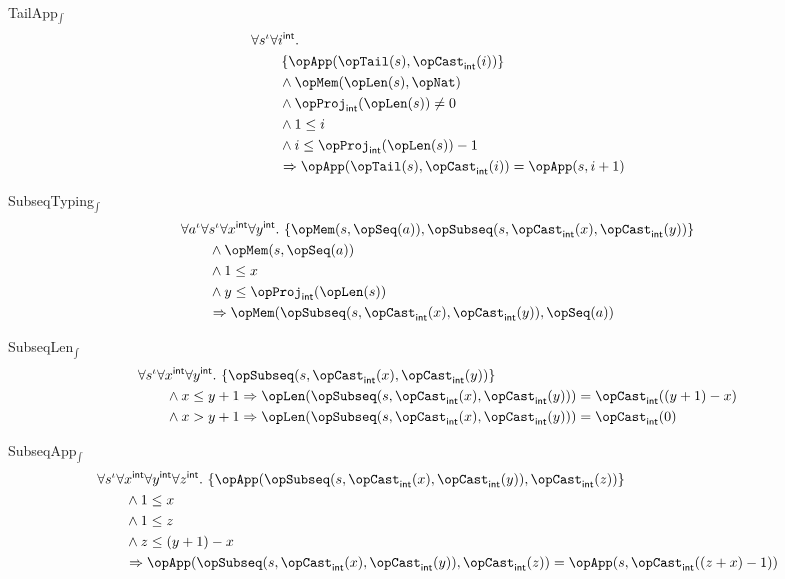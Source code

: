 \documentclass[11pt, a4paper, oneside]{article}
\begin{document}
\begin{axioms}
\item[TailApp$_\int$] \[
        \begin{aligned}
            &\forall s^\idv \forall i^\int. \\
            &\qquad \st{ \opApp(\opTail(s), \opCast_\int(i)) } \\
            &\qquad \wedge \opMem(\opLen(s), \opNat) \\
            &\qquad \wedge \opProj_\int(\opLen(s)) \neq 0 \\
            &\qquad \wedge 1 \le i \\
            &\qquad \wedge i \le \opProj_\int(\opLen(s)) - 1 \\
            &\qquad \imp \opApp(\opTail(s), \opCast_\int(i)) = \opApp(s, i + 1)
        \end{aligned}
    \]

\item[SubseqTyping$_\int$] \[
        \begin{aligned}
            &\forall a^\idv \forall s^\idv \forall x^\int \forall y^\int.\, \st{ \opMem(s, \opSeq(a)), \opSubseq(s, \opCast_\int(x), \opCast_\int(y)) } \\
            &\qquad \wedge \opMem(s, \opSeq(a)) \\
            &\qquad \wedge 1 \le x \\
            &\qquad \wedge y \le \opProj_\int(\opLen(s)) \\
            &\qquad \imp \opMem(\opSubseq(s, \opCast_\int(x), \opCast_\int(y)), \opSeq(a))
        \end{aligned}
    \]

\item[SubseqLen$_\int$] \[
        \begin{aligned}
            &\forall s^\idv \forall x^\int \forall y^\int.\, \st{ \opSubseq(s, \opCast_\int(x), \opCast_\int(y)) } \\
            &\qquad \wedge x \le y + 1 \imp \opLen(\opSubseq(s, \opCast_\int(x), \opCast_\int(y))) = \opCast_\int((y + 1) - x) \\
            &\qquad \wedge x > y + 1 \imp \opLen(\opSubseq(s, \opCast_\int(x), \opCast_\int(y))) = \opCast_\int(0)
        \end{aligned}
    \]

\item[SubseqApp$_\int$] \[
        \begin{aligned}
            &\forall s^\idv \forall x^\int \forall y^\int \forall z^\int.\, \st{ \opApp(\opSubseq(s, \opCast_\int(x), \opCast_\int(y)), \opCast_\int(z)) } \\
            &\qquad \wedge 1 \le x \\
            &\qquad \wedge 1 \le z \\
            &\qquad \wedge z \le (y + 1) - x \\
            &\qquad \imp \opApp(\opSubseq(s, \opCast_\int(x), \opCast_\int(y)), \opCast_\int(z)) = \opApp(s, \opCast_\int((z + x) - 1))
        \end{aligned}
    \]


\end{axioms}
\end{document}

